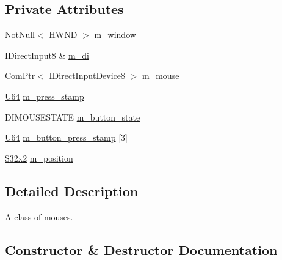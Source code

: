 \subsection*{Private Attributes}
\begin{DoxyCompactItemize}
\item 
\mbox{\hyperlink{namespacemage_a8769f9d670d6b585ea306cb1062af94b}{Not\+Null}}$<$ H\+W\+ND $>$ \mbox{\hyperlink{classmage_1_1input_1_1_mouse_1_1_impl_af478d106ce9e9e12ac32717c5523c7f5}{m\+\_\+window}}
\item 
I\+Direct\+Input8 \& \mbox{\hyperlink{classmage_1_1input_1_1_mouse_1_1_impl_af356557a537747ee5c852dba02795931}{m\+\_\+di}}
\item 
\mbox{\hyperlink{namespacemage_ae74f374780900893caa5555d1031fd79}{Com\+Ptr}}$<$ I\+Direct\+Input\+Device8 $>$ \mbox{\hyperlink{classmage_1_1input_1_1_mouse_1_1_impl_a1c5de7f34edab12846e75cf7d2b76094}{m\+\_\+mouse}}
\item 
\mbox{\hyperlink{namespacemage_a6672cf3c861707ce4a3235a3eb43941d}{U64}} \mbox{\hyperlink{classmage_1_1input_1_1_mouse_1_1_impl_a18304bef70290efaec61ad9eca140ce8}{m\+\_\+press\+\_\+stamp}}
\item 
D\+I\+M\+O\+U\+S\+E\+S\+T\+A\+TE \mbox{\hyperlink{classmage_1_1input_1_1_mouse_1_1_impl_a2ef89cc9d05fde7a7145c774380878cb}{m\+\_\+button\+\_\+state}}
\item 
\mbox{\hyperlink{namespacemage_a6672cf3c861707ce4a3235a3eb43941d}{U64}} \mbox{\hyperlink{classmage_1_1input_1_1_mouse_1_1_impl_af3ea37adb563ff1c353d8358a6a74818}{m\+\_\+button\+\_\+press\+\_\+stamp}} \mbox{[}3\mbox{]}
\item 
\mbox{\hyperlink{namespacemage_a4843c424aae7bb5fb6c440ed6ed593ee}{S32x2}} \mbox{\hyperlink{classmage_1_1input_1_1_mouse_1_1_impl_aaf430602e56efbeeae8d46012be4437e}{m\+\_\+position}}
\end{DoxyCompactItemize}


\subsection{Detailed Description}
A class of mouses. 

\subsection{Constructor \& Destructor Documentation}
\mbox{\label{classmage_1_1input_1_1_mouse_1_1_impl_a123b86c874208b15d61eae54a2633a68}} 
